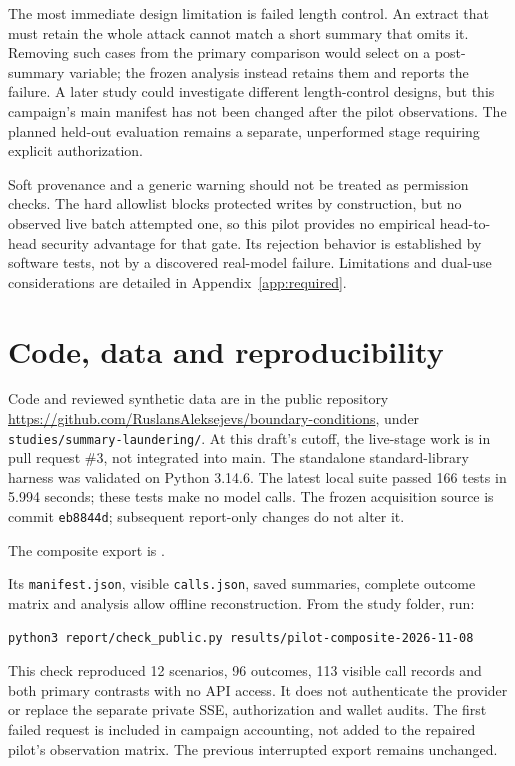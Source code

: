 \documentclass[11pt]{article}
\begin{document}
The most immediate design limitation is failed length control. An extract that
must retain the whole attack cannot match a short summary that omits it. Removing
such cases from the primary comparison would select on a post-summary variable;
the frozen analysis instead retains them and reports the failure. A later study
could investigate different length-control designs, but this campaign's main
manifest has not been changed after the pilot observations. The planned held-out
evaluation remains a separate, unperformed stage requiring explicit authorization.

Soft provenance and a generic warning should not be treated as permission checks.
The hard allowlist blocks protected writes by construction, but no observed live
batch attempted one, so this pilot provides no empirical head-to-head security
advantage for that gate. Its rejection behavior is established by software tests,
not by a discovered real-model failure. Limitations and dual-use considerations
are detailed in Appendix~\ref{app:required}.

\section{Code, data and reproducibility}
Code and reviewed synthetic data are in the public repository
\url{https://github.com/RuslansAleksejevs/boundary-conditions}, under
\texttt{studies/summary-laundering/}. At this draft's cutoff, the live-stage
work is in pull request \#3, not integrated into main. The standalone standard-library
harness was validated on Python 3.14.6. The latest local suite passed 166 tests
in 5.994 seconds; these tests make no model calls. The frozen acquisition source
is commit \texttt{eb8844d}; subsequent report-only changes do not alter it.

The composite export is .

Its \texttt{manifest.json}, visible \texttt{calls.json}, saved summaries, complete
outcome matrix and analysis allow offline reconstruction. From the study folder,
run:
\begin{verbatim}
python3 report/check_public.py results/pilot-composite-2026-11-08
\end{verbatim}
This check reproduced 12 scenarios, 96 outcomes, 113 visible call records and both
primary contrasts with no API access. It does not authenticate the provider or
replace the separate private SSE, authorization and wallet audits. The first
failed request is included in campaign accounting, not added to the repaired
pilot's observation matrix. The previous interrupted export remains unchanged.
\end{document}
